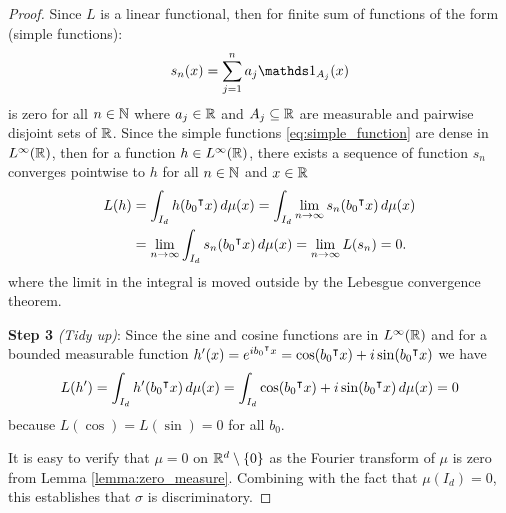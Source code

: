 \begin{proof}
    Since $L$ is a linear functional, then for finite sum of functions of the
    form (simple functions):
    \begin{equation}
        \label{eq:simple_function}
        s_n(x) = \sum_{j=1}^{n} a_j \indicator{A_j}(x)
    \end{equation}
    is zero for all $n\in\mathbb{N}$ where $a_j \in \mathbb{R}$ and ${A_j} \subseteq \mathbb{R}$ are
    measurable and pairwise disjoint sets of $\mathbb{R}$. Since the simple functions
    \eqref{eq:simple_function} are dense in $L^{\infty}(\mathbb{R})$, then for a
    function $h \in L^{\infty}(\mathbb{R})$, there exists a sequence of function $s_n$
    converges pointwise to $h$ for all $n \in \mathbb{N}$ and $x \in \mathbb{R}$
    \begin{align}
        L(h) &= \int_{I_d} h(b_0{}^{\intercal} x) \,d\mu(x) 
             = \int_{I_d} \lim_{n\to\infty} s_n(b_0{}^{\intercal} x) \,d\mu(x) \\
             &= \lim_{n\to\infty} \int_{I_d} s_n(b_0{}^{\intercal} x) \,d\mu(x)
             = \lim_{n\to\infty} L(s_n)
             = 0.
    \end{align}
    where the limit in the integral is moved outside by the Lebesgue convergence
    theorem.

    \textbf{Step 3} \textit{(Tidy up)}: Since the sine and cosine functions are
    in $L^{\infty}(\mathbb{R})$ and for a bounded measurable function $h'(x) =
    e^{ib_0{}^{\intercal} x} = \cos(b_0{}^{\intercal} x) + i \sin(b_0{}^{\intercal} x)$ we have
    \begin{equation}
        L(h') = \int_{I_d} h'(b_0{}^{\intercal} x) \,d\mu(x) 
              = \int_{I_d} \cos(b_0{}^{\intercal} x) + i \sin(b_0{}^{\intercal} x) \,d\mu(x)
              = 0
    \end{equation}
    because $L(\cos) = L(\sin) = 0$ for all $b_0$.

    It is easy to verify that $\mu = 0$ on $\mathbb{R}^d \setminus \{0\}$ as the Fourier
    transform of $\mu$ is zero from Lemma \ref{lemma:zero_measure}. Combining
    with the fact that $\mu(I_d) = 0$, this establishes that $\sigma$ is
    discriminatory.

\end{proof}




